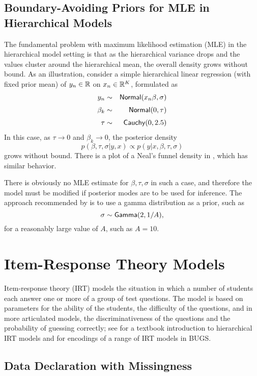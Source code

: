 \subsection{Boundary-Avoiding Priors for MLE in Hierarchical Models}

The fundamental problem with maximum likelihood estimation (MLE) in
the hierarchical model setting is that as the hierarchical variance
drops and the values cluster around the hierarchical mean, the overall
density grows without bound.  As an illustration, consider a simple
hierarchical linear regression (with fixed prior mean) of $y_n \in
\mathbb{R}$ on $x_n \in \mathbb{R}^K$, formulated as
%
\begin{eqnarray*}
y_n & \sim & \mbox{\sf Normal}(x_n \beta, \sigma)
\\[3pt]
\beta_k & \sim & \mbox{\sf Normal}(0,\tau)
\\[3pt]
\tau & \sim & \mbox{\sf Cauchy}(0,2.5)
\end{eqnarray*}
%
In this case, as $\tau \rightarrow 0$ and $\beta_k \rightarrow 0$, the
posterior density
\[
p(\beta,\tau,\sigma|y,x) \propto p(y|x,\beta,\tau,\sigma)
\]
grows without bound.  There is a plot of a Neal's funnel density in
, which has similar behavior.

There is obviously no MLE estimate for $\beta,\tau,\sigma$ in such a
case, and therefore the model must be modified if posterior modes are
to be used for inference.  The approach recommended by
\cite{ChungEtAl:2013} is to use a gamma distribution as a prior, such
as
%
\[
\sigma \sim \mbox{\sf Gamma}(2, 1/A),
\]
%
for a reasonably large value of $A$, such as $A = 10$.


\section{Item-Response Theory Models}

Item-response theory (IRT) models the situation in which a number of
students each answer one or more of a group of test questions.  The
model is based on parameters for the ability of the students, the
difficulty of the questions, and in more articulated models, the
discriminativeness of the questions and the probability of guessing
correctly; see \citep[pps.~314--320]{GelmanHill:2007} for a textbook
introduction to hierarchical IRT models and \citep{Curtis:2010} for
encodings of a range of IRT models in BUGS.


\subsection{Data Declaration with Missingness}

